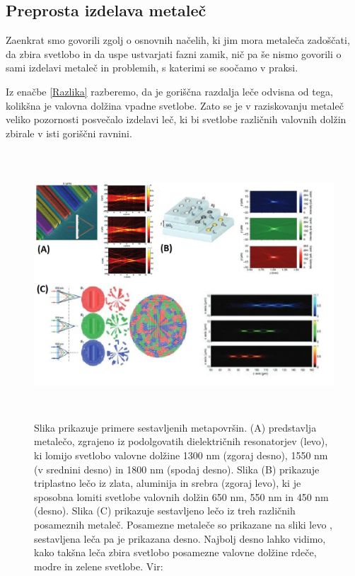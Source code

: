 \documentclass[12pt ]{article}
\begin{document}
 
\subsection{Preprosta izdelava metaleč}
Zaenkrat smo govorili zgolj o osnovnih načelih, ki jim mora metaleča zadoščati, da zbira svetlobo in da uspe ustvarjati fazni zamik, nič pa še nismo govorili o sami izdelavi metaleč in problemih, s katerimi se soočamo v praksi.

Iz enačbe \eqref{Razlika} razberemo, da je goriščna razdalja leče odvisna od tega, kolikšna je valovna dolžina vpadne svetlobe. Zato se je v raziskovanju metaleč veliko pozornosti posvečalo izdelavi leč, ki bi svetlobe različnih valovnih dolžin zbirale v isti goriščni ravnini. 

 \begin{figure}[H]
     \centering
     \includegraphics[width=13cm, height=10cm]{Slike/Lece.png}
     \caption{Slika prikazuje primere sestavljenih metapovršin. (A) predstavlja metalečo, zgrajeno iz podolgovatih dielektričnih resonatorjev (levo), ki lomijo svetlobo valovne dolžine 1300 nm (zgoraj desno), 1550 nm (v srednini desno) in 1800 nm (spodaj desno). Slika (B) prikazuje triplastno lečo iz zlata, aluminija in srebra (zgoraj levo), ki je sposobna lomiti svetlobe valovnih dolžin 650 nm, 550 nm in 450 nm (desno). Slika (C) prikazuje sestavljeno lečo iz treh različnih posameznih metaleč. Posamezne metaleče so prikazane na sliki levo , sestavljena leča pa je prikazana desno. Najbolj desno lahko vidimo, kako takšna leča zbira svetlobo posamezne valovne dolžine rdeče, modre in zelene svetlobe.  Vir: \cite{Metaleče_opis}  }
     \label{Geometrija}
 \end{figure}
 
\end{document}
